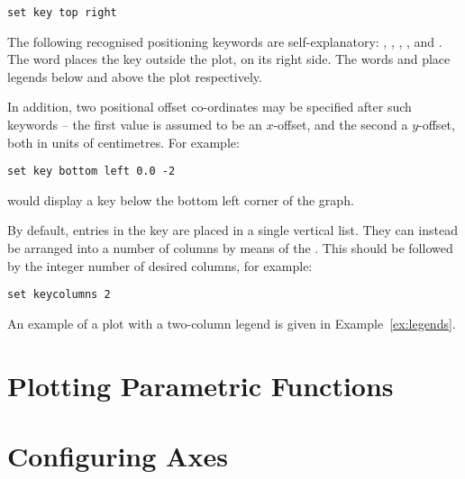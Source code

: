 \begin{verbatim}
set key top right
\end{verbatim}

The following recognised positioning keywords are self-explanatory:
, , , ,
 and . The word  places the
key outside the plot, on its right side. The words  and
 place legends below and above the plot respectively.

In addition, two positional offset co-ordinates may be specified after such
keywords -- the first value is assumed to be an $x$-offset, and the second a
$y$-offset, both in units of centimetres. For example:

\begin{verbatim}
set key bottom left 0.0 -2
\end{verbatim}

\noindent would display a key below the bottom left corner of the graph.

By default, entries in the key are placed in a single vertical list. They can
instead be arranged into a number of columns by means of the . This should be followed by the integer number of desired columns,
for example:

\begin{verbatim}
set keycolumns 2
\end{verbatim}

\noindent An example of a plot with a two-column legend is given in
Example~\ref{ex:legends}.


\section{Plotting Parametric Functions}

\section{Configuring Axes}
\label{sec:multiple_axes}

